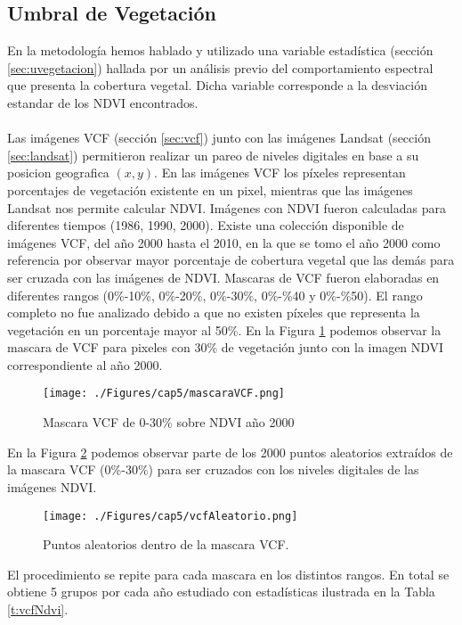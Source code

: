 \subsection{Umbral de Vegetaci\'on}\label{subsec:umbralVegetacion}
En la metodolog\'ia hemos hablado y utilizado una variable estad\'istica (secci\'on \ref{sec:uvegetacion}) hallada por un an\'alisis previo del comportamiento espectral que presenta la cobertura vegetal. Dicha variable corresponde a la desviaci\'on estandar de los NDVI encontrados.\\~\\
Las im\'agenes VCF (secci\'on \ref{sec:vcf}) junto con las im\'agenes Landsat (secci\'on \ref{sec:landsat}) permitieron realizar un pareo de niveles digitales en base a su posicion geografica $ (x,y) $. En las im\'agenes VCF los p\'ixeles representan porcentajes de vegetaci\'on existente en un pixel, mientras que las im\'agenes Landsat nos permite calcular NDVI. Im\'agenes con NDVI fueron calculadas para diferentes tiempos (1986, 1990, 2000). Existe una colecci\'on disponible de im\'agenes VCF, del a\~{n}o 2000 hasta el 2010, en la que se tomo el a\~{n}o 2000 como referencia por observar mayor porcentaje de cobertura vegetal que las dem\'as para ser cruzada con las im\'agenes de NDVI. Mascaras de VCF fueron elaboradas en diferentes rangos (0\%-10\%, 0\%-20\%, 0\%-30\%, 0\%-\%40 y 0\%-\%50). El rango completo no fue analizado debido a que no existen p\'ixeles que representa la vegetaci\'on en un porcentaje mayor al 50\%. En la Figura \ref{fig:mascVCf} podemos observar la mascara de VCF para pixeles con 30\% de vegetaci\'on junto con la imagen NDVI correspondiente al a\~{n}o 2000.
\begin{figure}[H]
	\centering
	\texttt{[image: ./Figures/cap5/mascaraVCF.png]}
	\caption{Mascara VCF de 0-30\% sobre NDVI a\~{n}o 2000}
	\label{fig:mascVCf}
\end{figure}
En la Figura \ref{fig:aleatorioVCf} podemos observar parte de los 2000 puntos aleatorios extra\'idos de la mascara VCF (0\%-30\%) para ser cruzados con los niveles digitales de las im\'agenes NDVI.
\begin{figure}[H]
	\centering
	\texttt{[image: ./Figures/cap5/vcfAleatorio.png]}
	\caption{Puntos aleatorios dentro de la mascara VCF.}
	\label{fig:aleatorioVCf}
\end{figure}
El procedimiento se repite para cada mascara en los distintos rangos. En total se obtiene 5 grupos por cada a\~{n}o estudiado con estad\'isticas ilustrada en la Tabla \ref{t:vcfNdvi}.

